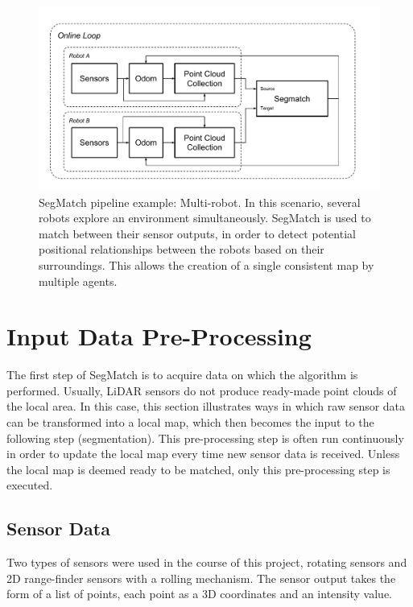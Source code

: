 \begin{figure}
  \centering
  \includegraphics[width=5.2in]{images/Multi-robot_Pipeline.pdf}
  \caption{SegMatch pipeline example: Multi-robot. In this scenario, several robots explore an environment simultaneously. SegMatch is used to match between their sensor outputs, in order to detect potential positional relationships between the robots based on their surroundings. This allows the creation of a single consistent map by multiple agents.}
  \label{fig:multirobot_pipeline}
\end{figure}


\section{Input Data Pre-Processing}
\label{sec:input}

The first step of SegMatch is to acquire data on which the algorithm is performed. Usually, LiDAR sensors do not produce ready-made point clouds of the local area. In this case, this section illustrates ways in which raw sensor data can be transformed into a local map, which then becomes the input to the following step (segmentation). This pre-processing step is often run continuously in order to update the local map every time new sensor data is received. Unless the local map is deemed ready to be matched, only this pre-processing step is executed.\\


\subsection{Sensor Data}
\label{subsec:sensordata}

Two types of sensors were used in the course of this project, rotating sensors and 2D range-finder sensors with a rolling mechanism. The sensor output takes the form of a list of points, each point as a 3D coordinates and an intensity value.\\

